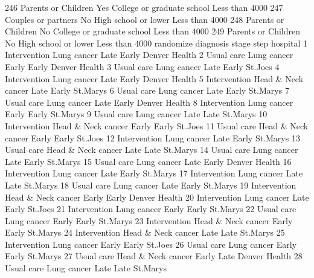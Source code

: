 \documentclass[
  letterpaper,
  DIV=11,
  numbers=noendperiod]{scrreprt}
\newenvironment{Shaded}{\begin{snugshade}}{\end{snugshade}}
\newcommand{\NormalTok}[1]{\textcolor[rgb]{0.00,0.23,0.31}{#1}}
\begin{document}
\begin{Shaded}
\begin{Highlighting}[]
\NormalTok{246 Parents or Children      Yes College or graduate school Less than 4000}
\NormalTok{247 Couples or partners       No       High school or lower Less than 4000}
\NormalTok{248 Parents or Children       No College or graduate school Less than 4000}
\NormalTok{249 Parents or Children       No       High school or lower Less than 4000}
\NormalTok{       randomize          diagnosis   stage  step        hospital}
\NormalTok{1   Intervention        Lung cancer    Late Early   Denver Health}
\NormalTok{2     Usual care        Lung cancer   Early Early   Denver Health}
\NormalTok{3     Usual care        Lung cancer    Late Early         St.Joes}
\NormalTok{4   Intervention        Lung cancer    Late Early   Denver Health}
\NormalTok{5   Intervention Head \& Neck cancer    Late Early        St.Marys}
\NormalTok{6     Usual care        Lung cancer    Late Early        St.Marys}
\NormalTok{7     Usual care        Lung cancer    Late Early   Denver Health}
\NormalTok{8   Intervention        Lung cancer   Early Early        St.Marys}
\NormalTok{9     Usual care        Lung cancer    Late  Late        St.Marys}
\NormalTok{10  Intervention Head \& Neck cancer   Early Early         St.Joes}
\NormalTok{11    Usual care Head \& Neck cancer   Early Early         St.Joes}
\NormalTok{12  Intervention        Lung cancer    Late Early        St.Marys}
\NormalTok{13    Usual care Head \& Neck cancer    Late  Late        St.Marys}
\NormalTok{14    Usual care        Lung cancer    Late Early        St.Marys}
\NormalTok{15    Usual care        Lung cancer    Late Early   Denver Health}
\NormalTok{16  Intervention        Lung cancer    Late Early        St.Marys}
\NormalTok{17  Intervention        Lung cancer    Late  Late        St.Marys}
\NormalTok{18    Usual care        Lung cancer    Late Early        St.Marys}
\NormalTok{19  Intervention Head \& Neck cancer   Early Early   Denver Health}
\NormalTok{20  Intervention        Lung cancer    Late Early         St.Joes}
\NormalTok{21  Intervention        Lung cancer   Early Early        St.Marys}
\NormalTok{22    Usual care        Lung cancer   Early Early        St.Marys}
\NormalTok{23  Intervention Head \& Neck cancer   Early Early        St.Marys}
\NormalTok{24  Intervention Head \& Neck cancer    Late  Late        St.Marys}
\NormalTok{25  Intervention        Lung cancer   Early Early         St.Joes}
\NormalTok{26    Usual care        Lung cancer   Early Early        St.Marys}
\NormalTok{27    Usual care Head \& Neck cancer   Early  Late   Denver Health}
\NormalTok{28    Usual care        Lung cancer    Late  Late        St.Marys}

\end{Highlighting}
\end{Shaded}
\end{document}
